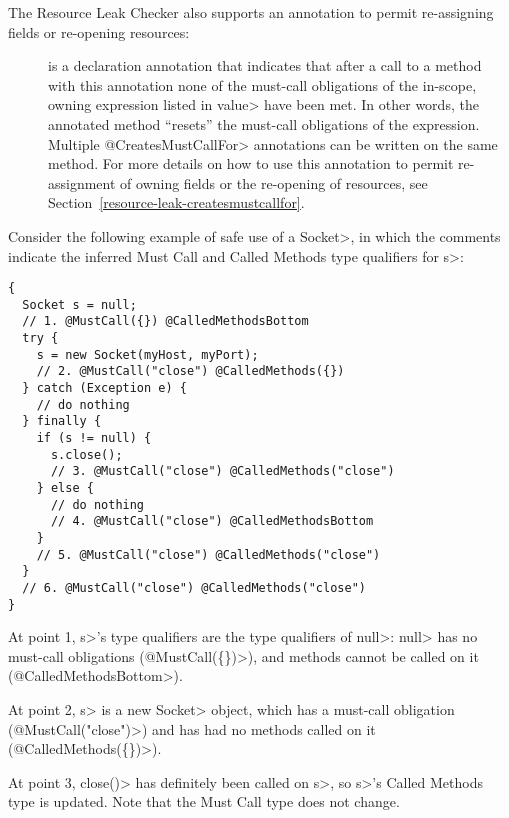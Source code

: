 The Resource Leak Checker also supports an annotation to permit re-assigning
fields or re-opening resources:

\begin{description}

\item[]
  is a declaration annotation that indicates that after a call to a method
  with this annotation none of the must-call obligations of the in-scope, owning expression
  listed in \<value> have been met.
  In other words, the annotated method ``resets'' the must-call obligations of the expression.
  Multiple \<@CreatesMustCallFor>
  annotations can be written on the same method.  For more details
  on how to use this annotation to permit re-assignment of owning
  fields or the re-opening of resources, see Section~\ref{resource-leak-createsmustcallfor}.

\end{description}



Consider the following example of safe use of a \<Socket>, in which the comments indicate the
inferred Must Call and Called Methods type qualifiers for \<s>:
\begin{verbatim}
{
  Socket s = null;
  // 1. @MustCall({}) @CalledMethodsBottom
  try {
    s = new Socket(myHost, myPort);
    // 2. @MustCall("close") @CalledMethods({})
  } catch (Exception e) {
    // do nothing
  } finally {
    if (s != null) {
      s.close();
      // 3. @MustCall("close") @CalledMethods("close")
    } else {
      // do nothing
      // 4. @MustCall("close") @CalledMethodsBottom
    }
    // 5. @MustCall("close") @CalledMethods("close")
  }
  // 6. @MustCall("close") @CalledMethods("close")
}
\end{verbatim}

At point 1, \<s>'s type qualifiers are the type qualifiers of \<null>:
\<null> has no must-call obligations (\<@MustCall(\{\})>),
and methods cannot be called on it (\<@CalledMethodsBottom>).

At point 2, \<s> is a new \<Socket> object, which
has a must-call obligation (\<@MustCall("close")>)
and has had no methods called on it (\<@CalledMethods(\{\})>).

At point 3, \<close()> has definitely been called on \<s>, so
\<s>'s Called Methods type is updated. Note that the Must Call type
does not change.

